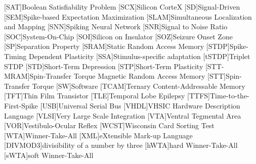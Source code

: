 [SAT]{Boolean Satisfiability Problem}
[SCX]{Silicon CorteX}
[SD]{Signal-Driven}
[SEM]{Spike-based Expectation Maximization}
[SLAM]{Simultaneous Localization and Mapping}
[SNN]{Spiking Neural Network}
[SNR]{Signal to Noise Ratio}
[SOC]{System-On-Chip}
[SOI]{Silicon on Insulator}
[SOZ]{Seizure Onset Zone}
[SP]{Separation Property}
[SRAM]{Static Random Access Memory}
[STDP]{Spike-Timing Dependent Plasticity}
[SSA]{Stimulus-specific adaptation}
[tSTDP]{Triplet STDP}
[STD]{Short-Term Depression}
[STP]{Short-Term Plasticity}
[STT-MRAM]{Spin-Transfer Torque Magnetic Random Access Memory}
[STT]{Spin-Transfer Torque}
[SW]{Software}
[TCAM]{Ternary Content-Addressable Memory}
[TFT]{Thin Film Transistor}
[TLE]{Temporal Lobe Epilepsy}
[TTFS]{Time-to-the-First-Spike}
[USB]{Universal Serial Bus}
[VHDL]{VHSIC Hardware Description Language}
[VLSI]{Very Large Scale Integration}
[VTA]{Ventral Tegmental Area}
[VOR]{Vestibulo-Ocular Reflex}
[WCST]{Wisconsin Card Sorting Test}
[WTA]{Winner-Take-All}
[XML]{eXtensible Mark-up Language}
[DIVMOD3]{divisibility of a number by three}
[hWTA]{hard Winner-Take-All}
[sWTA]{soft Winner-Take-All}
